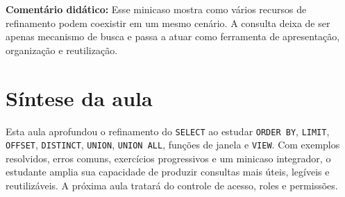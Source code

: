 \textbf{Comentário didático:}
Esse minicaso mostra como vários recursos de refinamento podem coexistir em um mesmo cenário. A consulta deixa de ser apenas mecanismo de busca e passa a atuar como ferramenta de apresentação, organização e reutilização.

\section{Síntese da aula}

Esta aula aprofundou o refinamento do \texttt{SELECT} ao estudar \texttt{ORDER BY}, \texttt{LIMIT}, \texttt{OFFSET}, \texttt{DISTINCT}, \texttt{UNION}, \texttt{UNION ALL}, funções de janela e \texttt{VIEW}. Com exemplos resolvidos, erros comuns, exercícios progressivos e um minicaso integrador, o estudante amplia sua capacidade de produzir consultas mais úteis, legíveis e reutilizáveis. A próxima aula tratará do controle de acesso, roles e permissões.
